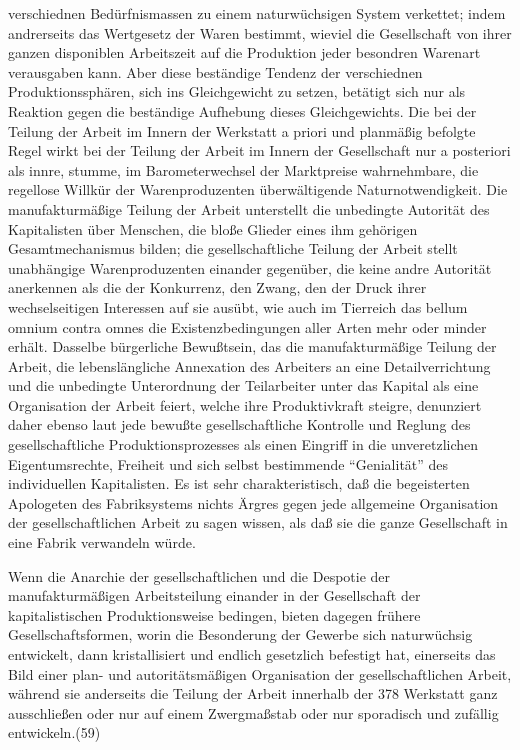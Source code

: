{verschiednen Bedürfnismassen zu einem naturwüchsigen System verkettet;
indem andrerseits das Wertgesetz der Waren bestimmt, wieviel die
Gesellschaft von ihrer ganzen disponiblen Arbeitszeit auf die Produktion
jeder besondren Warenart verausgaben kann. Aber diese beständige Tendenz
der verschiednen Produktionssphären, sich ins Gleichgewicht zu setzen,
betätigt sich nur als Reaktion gegen die beständige Aufhebung dieses
Gleichgewichts. Die bei der Teilung der Arbeit im Innern der Werkstatt a
priori und planmäßig befolgte Regel wirkt bei der Teilung der Arbeit im
Innern der Gesellschaft nur a posteriori als innre, stumme, im
Barometerwechsel der Marktpreise wahrnehmbare, die regellose Willkür der
Warenproduzenten überwältigende Naturnotwendigkeit. Die manufakturmäßige
Teilung der Arbeit unterstellt die unbedingte Autorität des Kapitalisten
über Menschen, die bloße Glieder eines ihm gehörigen Gesamtmechanismus
bilden; die gesellschaftliche Teilung der Arbeit stellt unabhängige
Warenproduzenten einander gegenüber, die keine andre Autorität
anerkennen als die der Konkurrenz, den Zwang, den der Druck ihrer
wechselseitigen Interessen auf sie ausübt, wie auch im Tierreich das
bellum omnium contra omnes die Existenzbedingungen aller Arten mehr oder
minder erhält. Dasselbe bürgerliche Bewußtsein, das die manufakturmäßige
Teilung der Arbeit, die lebenslängliche Annexation des Arbeiters an eine
Detailverrichtung und die unbedingte Unterordnung der Teilarbeiter unter
das Kapital als eine Organisation der Arbeit feiert, welche ihre
Produktivkraft steigre, denunziert daher ebenso laut jede bewußte
gesellschaftliche Kontrolle und Reglung des gesellschaftliche
Produktionsprozesses als einen Eingriff in die unveretzlichen
Eigentumsrechte, Freiheit und sich selbst bestimmende ``Genialität'' des
individuellen Kapitalisten. Es ist sehr charakteristisch, daß die
begeisterten Apologeten des Fabriksystems nichts Ärgres gegen jede
allgemeine Organisation der gesellschaftlichen Arbeit zu sagen wissen,
als daß sie die ganze Gesellschaft in eine Fabrik verwandeln würde.

Wenn die Anarchie der gesellschaftlichen und die Despotie der
manufakturmäßigen Arbeitsteilung einander in der Gesellschaft der
kapitalistischen Produktionsweise bedingen, bieten dagegen frühere
Gesellschaftsformen, worin die Besonderung der Gewerbe sich naturwüchsig
entwickelt, dann kristallisiert und endlich gesetzlich befestigt hat,
einerseits das Bild einer plan- und autoritätsmäßigen Organisation der
gesellschaftlichen Arbeit, während sie anderseits die Teilung der Arbeit
innerhalb der \num{378} Werkstatt ganz ausschließen
oder nur auf einem Zwergmaßstab oder nur sporadisch und zufällig
entwickeln.(59)

}
